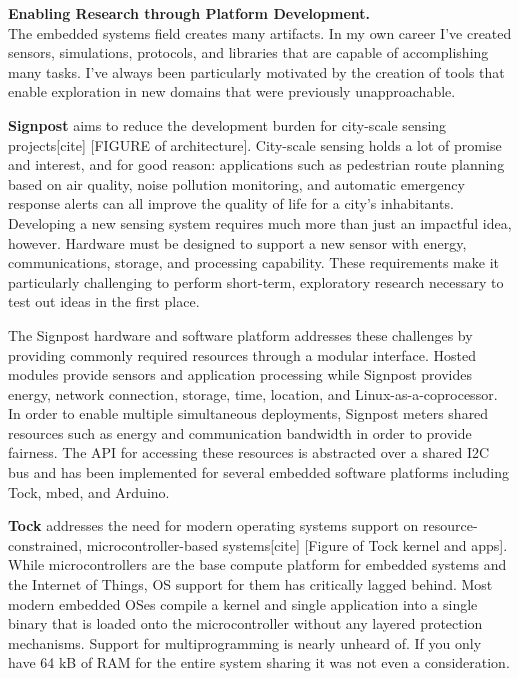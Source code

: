 \documentclass[11pt]{article} %
\begin{document}
\textbf{\textsf{\large Enabling Research through Platform Development.}}\\
The embedded systems field creates many artifacts. In my own career I've
created sensors, simulations, protocols, and libraries that are capable of
accomplishing many tasks. I've always been particularly motivated by the
creation of tools that enable exploration in new domains that were previously
unapproachable.

\textbf{Signpost} aims to reduce the development burden for city-scale sensing
projects[cite] [FIGURE of architecture]. City-scale sensing holds a lot of
promise and interest, and for good reason: applications such as pedestrian
route planning based on air quality, noise pollution monitoring, and automatic
emergency response alerts can all improve the quality of life for a city's
inhabitants. Developing a new sensing system requires much more than just an
impactful idea, however. Hardware must be designed to support a new sensor with
energy, communications, storage, and processing capability. These requirements
make it particularly challenging to perform short-term, exploratory research
necessary to test out ideas in the first place.

The Signpost hardware and software platform addresses these challenges by
providing commonly required resources through a modular interface. Hosted
modules provide sensors and application processing while Signpost provides
energy, network connection, storage, time, location, and
Linux-as-a-coprocessor. In order to enable multiple simultaneous deployments,
Signpost meters shared resources such as energy and communication bandwidth in
order to provide fairness. The API for accessing these resources is abstracted
over a shared I2C bus and has been implemented for several embedded software
platforms including Tock, mbed, and Arduino.

\textbf{Tock} addresses the need for modern operating systems support on
resource-constrained, microcontroller-based systems[cite] [Figure of Tock
kernel and apps]. While microcontrollers are the base compute platform for
embedded systems and the Internet of Things, OS support for them has critically
lagged behind. Most modern embedded OSes compile a kernel and single
application into a single binary that is loaded onto the microcontroller
without any layered protection mechanisms. Support for multiprogramming is
nearly unheard of. If you only have 64 kB of RAM for the entire system sharing
it was not even a consideration.
\end{document}
